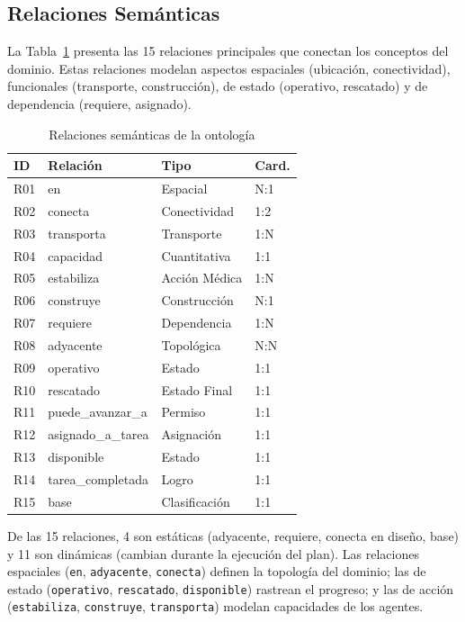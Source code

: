 \documentclass[conference]{IEEEtran}
\begin{document}
    \subsection{Relaciones Semánticas}

    La Tabla~\ref{tab:relaciones} presenta las 15 relaciones principales que conectan los conceptos del dominio. Estas relaciones modelan aspectos espaciales (ubicación, conectividad), funcionales (transporte, construcción), de estado (operativo, rescatado) y de dependencia (requiere, asignado).

    \begin{table}[htbp]
    \caption{Relaciones semánticas de la ontología}
    \label{tab:relaciones}
    \centering
    \small
    \begin{tabular}{@{}llll@{}}
    \toprule
    \textbf{ID} & \textbf{Relación} & \textbf{Tipo} & \textbf{Card.} \\
    \midrule
    R01 & en & Espacial & N:1 \\
    R02 & conecta & Conectividad & 1:2 \\
    R03 & transporta & Transporte & 1:N \\
    R04 & capacidad & Cuantitativa & 1:1 \\
    R05 & estabiliza & Acción Médica & 1:N \\
    R06 & construye & Construcción & N:1 \\
    R07 & requiere & Dependencia & 1:N \\
    R08 & adyacente & Topológica & N:N \\
    R09 & operativo & Estado & 1:1 \\
    R10 & rescatado & Estado Final & 1:1 \\
    R11 & puede\_avanzar\_a & Permiso & 1:1 \\
    R12 & asignado\_a\_tarea & Asignación & 1:1 \\
    R13 & disponible & Estado & 1:1 \\
    R14 & tarea\_completada & Logro & 1:1 \\
    R15 & base & Clasificación & 1:1 \\
    \bottomrule
    \end{tabular}
    \end{table}

    De las 15 relaciones, 4 son estáticas (adyacente, requiere, conecta en diseño, base) y 11 son dinámicas (cambian durante la ejecución del plan). Las relaciones espaciales (\texttt{en}, \texttt{adyacente}, \texttt{conecta}) definen la topología del dominio; las de estado (\texttt{operativo}, \texttt{rescatado}, \texttt{disponible}) rastrean el progreso; y las de acción (\texttt{estabiliza}, \texttt{construye}, \texttt{transporta}) modelan capacidades de los agentes.
\end{document}
